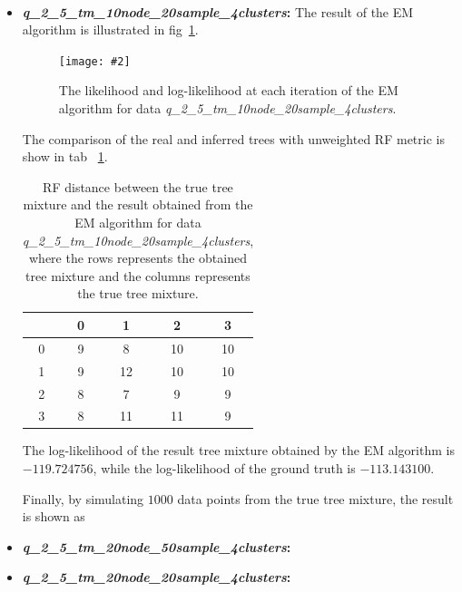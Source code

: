 \documentclass[11pt]{extarticle}
\newcommand{\0}{\mathbf{0}}
\renewcommand{\(}{\left(}
\renewcommand{\)}{\right)}
\theoremstyle{definition}
\newcommand{\image}[3]{
	\begin{figure}[!ht]
		\centering
	    \texttt{[image: \#2]}
		\caption{#3}
		\label{fig:#2}
	\end{figure}
}
\begin{document}
\noindent{} \\
\begin{itemize}
	\item \textbf{\textit{q\_2\_5\_tm\_10node\_20sample\_4clusters}:} The result of the EM algorithm is illustrated in fig~\ref{fig:D10_N20_K4}.
	\image{0.9}{D10_N20_K4}{The likelihood and log-likelihood at each iteration of the EM algorithm for data \textit{q\_2\_5\_tm\_10node\_20sample\_4clusters}.}
	\par The comparison of the real and inferred trees with unweighted RF metric is show in tab~ \ref{tab:RF_D10_N20_K4}.
	\begin{table}[!ht]
		\centering
		\caption{RF distance between the true tree mixture and the result obtained from the EM algorithm for data \textit{q\_2\_5\_tm\_10node\_20sample\_4clusters}, where the rows represents the obtained tree mixture and the columns represents the true tree mixture.}
		\begin{tabular}{c|cccc}
			 & 0 & 1 & 2 & 3 \\
			 \hline
			 0 & 9 & 8 & 10 & 10 \\
			 1 & 9 & 12 & 10 & 10 \\
			 2 & 8 & 7 & 9 & 9 \\
			 3 & 8 & 11 & 11 & 9
		\end{tabular}
		\label{tab:RF_D10_N20_K4}
	\end{table}
	\par The log-likelihood of the result tree mixture obtained by the EM algorithm is $-119.724756$, while the log-likelihood of the ground truth is $-113.143100$.
	\par Finally, by simulating $1000$ data points from the true tree mixture, the result is shown as 

	\item \textbf{\textit{q\_2\_5\_tm\_20node\_50sample\_4clusters}:}
	
	\item \textbf{\textit{q\_2\_5\_tm\_20node\_20sample\_4clusters}:}

\end{itemize}
\end{document}
